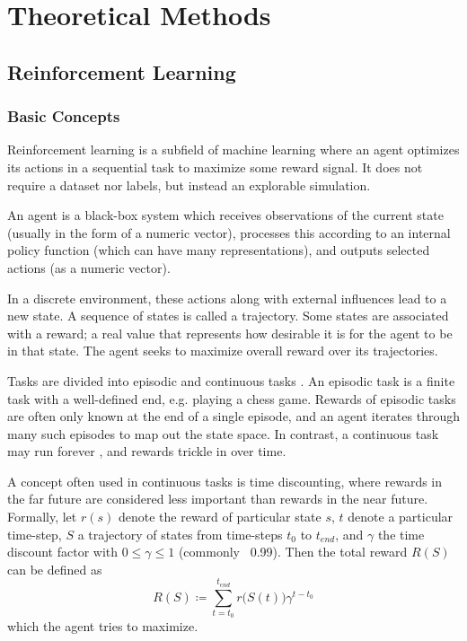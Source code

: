 \chapter{Theoretical Methods}


\section{Reinforcement Learning}
\label{ReinforcementLearningChapter}
\subsection{Basic Concepts}
Reinforcement learning is a subfield of machine learning where an agent optimizes its actions in a sequential task to maximize some reward signal. It does not require a dataset nor labels, but instead an explorable simulation.

An agent is a black-box system which receives observations of the current state (usually in the form of a numeric vector), processes this according to an internal policy function (which can have many representations), and outputs selected actions (as a numeric vector).

In a discrete environment, these actions along with external influences lead to a new state. A sequence of states is called a trajectory. Some states are associated with a reward; a real value that represents how desirable it is for the agent to be in that state. The agent seeks to maximize overall reward over its trajectories.

Tasks are divided into episodic and continuous tasks \cite[chapters 3.3 \& 3.4]{Sutton}. An episodic task is a finite task with a well-defined end, e.g. playing a chess game. Rewards of episodic tasks are often only known at the end of a single episode, and an agent iterates through many such episodes to map out the state space. In contrast, a continuous task may run forever , and rewards trickle in over time.

A concept often used in continuous tasks is time discounting, where rewards in the far future are considered less important than rewards in the near future. Formally, let $r(s)$ denote the reward of particular state $s$, $t$ denote a particular time-step, $S$ a trajectory of states from time-steps $t_0$ to $t_{end}$, and $\gamma$ the time discount factor with $0 \leq \gamma \leq 1$ (commonly ~0.99). Then the total reward $R(S)$ can be defined as
\begin{equation}
    R(S) \coloneqq \sum_{t=t_0}^{t_{end}}{r\big(S(t)\big)\gamma^{t-t_0}}
\end{equation}
which the agent tries to maximize.

